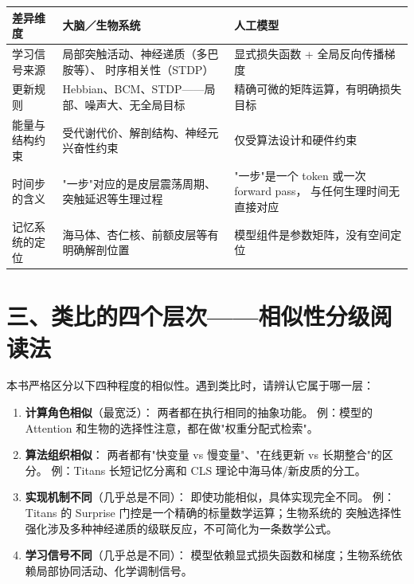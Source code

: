 \begin{center}
\begin{tabular}{p{4.5cm} p{4.5cm} p{4cm}}
\toprule
\textbf{差异维度} & \textbf{大脑／生物系统} & \textbf{人工模型} \\
\midrule
学习信号来源
  & 局部突触活动、神经递质（多巴胺等）、
    时序相关性（STDP）
  & 显式损失函数 + 全局反向传播梯度 \\
\midrule
更新规则
  & Hebbian、BCM、STDP——局部、噪声大、无全局目标
  & 精确可微的矩阵运算，有明确损失目标 \\
\midrule
能量与结构约束
  & 受代谢代价、解剖结构、神经元兴奋性约束
  & 仅受算法设计和硬件约束 \\
\midrule
时间步的含义
  & "一步"对应的是皮层震荡周期、突触延迟等生理过程
  & "一步"是一个 token 或一次 forward pass，
    与任何生理时间无直接对应 \\
\midrule
记忆系统的定位
  & 海马体、杏仁核、前额皮层等有明确解剖位置
  & 模型组件是参数矩阵，没有空间定位 \\
\bottomrule
\end{tabular}
\end{center}

\section*{三、类比的四个层次——相似性分级阅读法}

本书严格区分以下四种程度的相似性。遇到类比时，请辨认它属于哪一层：

\begin{enumerate}
  \item \textbf{计算角色相似}（最宽泛）：
    两者都在执行相同的抽象功能。
    例：模型的 Attention 和生物的选择性注意，都在做"权重分配式检索"。

  \item \textbf{算法组织相似}：
    两者都有"快变量 vs 慢变量"、"在线更新 vs 长期整合"的区分。
    例：Titans 长短记忆分离和 CLS 理论中海马体/新皮质的分工。

  \item \textbf{实现机制不同}（几乎总是不同）：
    即使功能相似，具体实现完全不同。
    例：Titans 的 Surprise 门控是一个精确的标量数学运算；生物系统的
    突触选择性强化涉及多种神经递质的级联反应，不可简化为一条数学公式。

  \item \textbf{学习信号不同}（几乎总是不同）：
    模型依赖显式损失函数和梯度；生物系统依赖局部协同活动、化学调制信号。
\end{enumerate}

